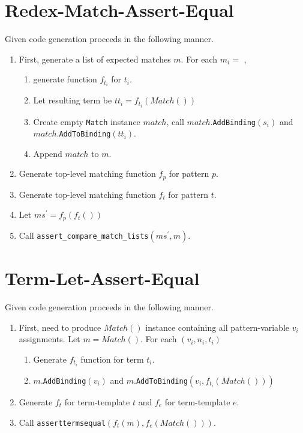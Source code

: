 \section{Redex-Match-Assert-Equal}
Given \RedexMatchAssertEqual code generation proceeds in the following manner.

\begin{enumerate}
\item First, generate a list of expected matches $m$. For each $m_i =$ \Match, 
\begin{enumerate}

\item generate function $f_{t_i}$ for $t_i$. 
\item Let resulting term be $tt_i = f_{t_i}(Match())$ 
\item Create empty \texttt{Match} instance $match$, call $match$.\texttt{AddBinding}$(s_i)$ and $match$.\texttt{AddToBinding}$(tt_i)$. 
\item Append $match$ to $m$.
\end{enumerate}
\item Generate top-level matching function $f_p$ for pattern $p$.
\item Generate top-level matching function $f_t$ for pattern $t$.
\item Let $ms^\prime = f_p(f_t())$
\item Call \texttt{assert\_compare\_match\_lists}$(ms^\prime, m)$.
\end{enumerate}

\section{Term-Let-Assert-Equal}

Given \TermLetAssertEqual code generation proceeds in the following manner.

\begin{enumerate}
\item First, need to produce $Match()$ instance containing all pattern-variable $v_i$ assignments. Let $m=Match()$. For each $(v_i, n_i, t_i)$
	\begin{enumerate}
	\item Generate $f_{t_i}$ function for term $t_i$.
	\item $m$.\texttt{AddBinding}$(v_i)$ and $m$.\texttt{AddToBinding}$(v_i, f_{t_i}(Match()))$
	\end{enumerate}
\item Generate $f_t$ for term-template $t$ and $f_e$ for term-template $e$.
\item Call \texttt{asserttermsequal}$(f_t(m), f_e(Match()))$.
\end{enumerate}


